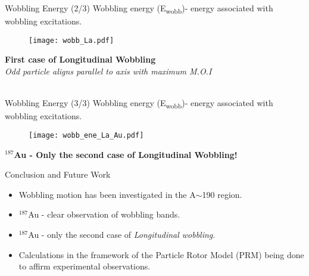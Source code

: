 \documentclass [aspectratio=169]{beamer}
\begin{document}
\begin{frame}{Wobbling Energy (2/3)}
Wobbling energy (E\textsubscript{wobb})- energy associated with wobbling excitations.
\begin{center}
\begin{figure}
\texttt{[image: wobb\_La.pdf]}
\end{figure}
\textbf{First case of Longitudinal Wobbling}\\
\textit{Odd particle aligns parallel to axis with maximum M.O.I}\\~\\
\end{center}
\end{frame}


\begin{frame}{Wobbling Energy (3/3)}
Wobbling energy (E\textsubscript{wobb})- energy associated with wobbling excitations.
\begin{center}
\begin{figure}
\texttt{[image: wobb\_ene\_La\_Au.pdf]}
\end{figure}
\textbf{$^{187}$Au - Only the second case of Longitudinal Wobbling!}
\end{center}
\end{frame}


\begin{frame}{Conclusion and Future Work}
\begin{itemize}
\item{Wobbling motion has been investigated in the A$\sim$190 region.}
\item{$^{187}$Au - clear observation of wobbling bands.}
\item{$^{187}$Au - only the second case of \textit{Longitudinal wobbling}.}
\item{Calculations in the framework of the Particle Rotor Model (PRM) being done to affirm experimental observations.}
\end{itemize}
\end{frame}
\end{document}
